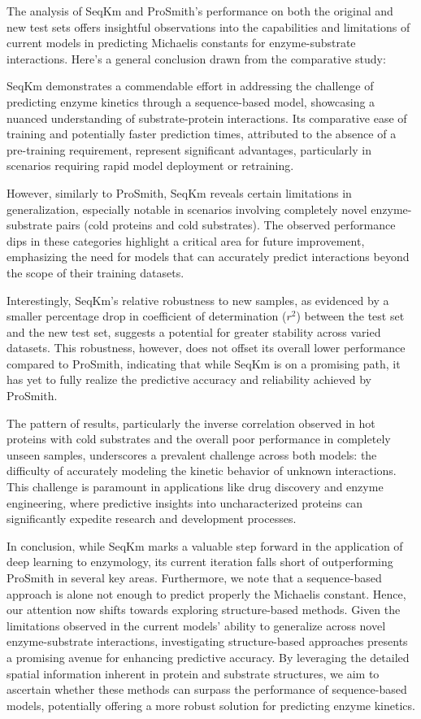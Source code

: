 The analysis of SeqKm and ProSmith's performance on both the original and new test sets offers insightful observations into the capabilities and limitations of current models in predicting Michaelis constants for enzyme-substrate interactions. Here's a general conclusion drawn from the comparative study:

SeqKm demonstrates a commendable effort in addressing the challenge of predicting enzyme kinetics through a sequence-based model, showcasing a nuanced understanding of substrate-protein interactions. Its comparative ease of training and potentially faster prediction times, attributed to the absence of a pre-training requirement, represent significant advantages, particularly in scenarios requiring rapid model deployment or retraining.

However, similarly to ProSmith, SeqKm reveals certain limitations in generalization, especially notable in scenarios involving completely novel enzyme-substrate pairs (cold proteins and cold substrates). The observed performance dips in these categories highlight a critical area for future improvement, emphasizing the need for models that can accurately predict interactions beyond the scope of their training datasets.

Interestingly, SeqKm's relative robustness to new samples, as evidenced by a smaller percentage drop in coefficient of determination ($r^2$) between the test set and the new test set, suggests a potential for greater stability across varied datasets. This robustness, however, does not offset its overall lower performance compared to ProSmith, indicating that while SeqKm is on a promising path, it has yet to fully realize the predictive accuracy and reliability achieved by ProSmith.

The pattern of results, particularly the inverse correlation observed in hot proteins with cold substrates and the overall poor performance in completely unseen samples, underscores a prevalent challenge across both models: the difficulty of accurately modeling the kinetic behavior of unknown interactions. This challenge is paramount in applications like drug discovery and enzyme engineering, where predictive insights into uncharacterized proteins can significantly expedite research and development processes.

In conclusion, while SeqKm marks a valuable step forward in the application of deep learning to enzymology, its current iteration falls short of outperforming ProSmith in several key areas. Furthermore, we note that a sequence-based approach is alone not enough to predict properly the Michaelis constant. Hence, our attention now shifts towards exploring structure-based methods. Given the limitations observed in the current models' ability to generalize across novel enzyme-substrate interactions, investigating structure-based approaches presents a promising avenue for enhancing predictive accuracy. By leveraging the detailed spatial information inherent in protein and substrate structures, we aim to ascertain whether these methods can surpass the performance of sequence-based models, potentially offering a more robust solution for predicting enzyme kinetics.